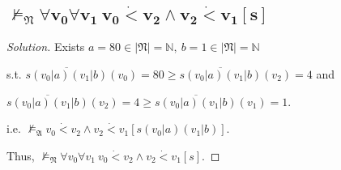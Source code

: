 \documentclass{article}
\newenvironment{solution}{\begin{proof}[\noindent\it Solution]}{\end{proof}}
\begin{document}
\subsection{$\boldsymbol{\nvDash_{\mathfrak{N}}\forall v_0\forall v_1\ v_0\dot{<}v_2\land v_2\dot{<}v_1[s]}$}
\vspace{1em}
\begin{solution}
    Exists $a=80\in|\mathfrak{N}|=\mathbb{N},\ b=1\in|\mathfrak{N}|=\mathbb{N}$ 
    
    \hspace{2.6em}
    s.t. $\overline{s(v_0|a)(v_1|b)}(v_0)=80\geq\overline{s(v_0|a)(v_1|b)}(v_2)=4$ and
    
    \hspace{4.4em}
    $\overline{s(v_0|a)(v_1|b)}(v_2)=4\geq\overline{s(v_0|a)(v_1|b)}(v_1)=1$.
    
    \hspace{2.6em}
    i.e. $\nvDash_\mathfrak{A} v_0\dot{<}v_2\land v_2\dot{<}v_1[s(v_0|a)(v_1|b)]$.

    \hspace{2.6em}
    Thus, $\nvDash_{\mathfrak{N}}\forall v_0\forall v_1\ v_0\dot{<}v_2\land v_2\dot{<}v_1[s].$
\end{solution}

\vspace{1em}
\end{document}

